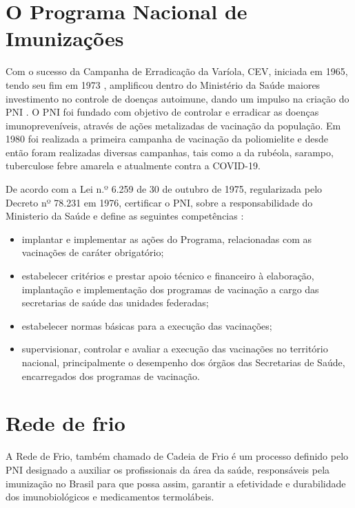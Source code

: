 \section{O Programa Nacional de Imunizações}
\label{intro:PNI}
Com o sucesso da Campanha de Erradicação da Varíola, CEV, iniciada em 1965, tendo seu fim em 1973 \cite{muniz2011memorias}, amplificou dentro do Ministério da Saúde maiores investimento no controle de doenças autoimune, dando um impulso na criação do PNI \cite{temporao2003programa}. O PNI foi fundado com objetivo de controlar e erradicar as doenças imunopreveníveis, através de ações metalizadas de vacinação da população. Em 1980 foi realizada a primeira campanha de vacinação da poliomielite e desde então foram realizadas diversas campanhas, tais como a da rubéola, sarampo, tuberculose febre amarela \cite{temporao2003programa, ministerio2001manual} e atualmente contra a COVID-19.

De acordo com a Lei n.º 6.259 de 30 de outubro de 1975, regularizada pelo Decreto nº 78.231 em 1976, certificar o PNI, sobre a responsabilidade do Ministerio da Saúde e define as seguintes competências \cite{ministerio2001manual}:

  \begin{itemize}
    \item implantar e implementar as ações do Programa, relacionadas com as vacinações de caráter obrigatório;
    \item  estabelecer critérios e prestar apoio técnico e financeiro à elaboração, implantação e implementação dos programas de vacinação a cargo das secretarias de saúde das unidades federadas;
    \item estabelecer normas básicas para a execução das vacinações;
    \item supervisionar, controlar e avaliar a execução das vacinações no território nacional, principalmente o desempenho dos órgãos das Secretarias de Saúde, encarregados dos programas de vacinação.
  \end{itemize}

\section{Rede de frio}
\label{intro:redes-de-frio}
A Rede de Frio, também chamado de Cadeia de Frio é um processo definido pelo PNI designado a auxiliar os profissionais da área da saúde, responsáveis pela imunização no Brasil para que possa assim, garantir a efetividade e durabilidade dos imunobiológicos e medicamentos termolábeis.

